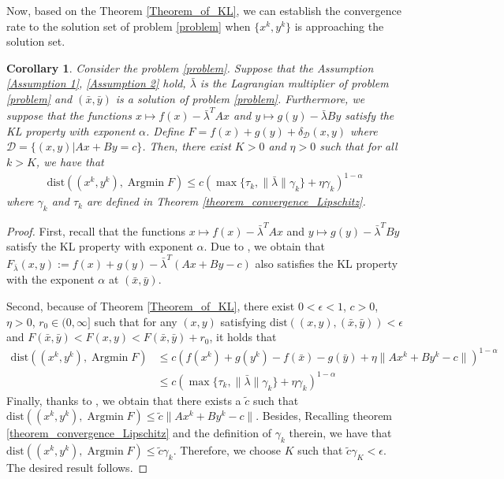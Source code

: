 \documentclass{article}
\numberwithin{equation}{section}
\newtheorem{corollary}{Corollary}[theorem]
\def\Argmin{\mathop{\mathrm{Argmin}}}
\begin{document}
    Now, based on the Theorem \ref{Theorem_of_KL}, we can establish the convergence rate to the solution set 
    of problem \ref{problem} when $\{x^k,y^k\}$ is approaching the solution set. 
    \begin{corollary}
        Consider the problem \ref{problem}. Suppose that the Assumption \ref{Assumption 1}, \ref{Assumption 2} 
        hold, $\bar{\lambda}$ is the Lagrangian multiplier of problem \ref{problem} and $(\bar{x}, \bar{y})$ is a 
        solution of problem \ref{problem}. Furthermore, we suppose that 
        the functions $x \mapsto f(x) -\bar{\lambda}^TAx$ and $y\mapsto g(y)-\bar{\lambda}By$ satisfy the KL property 
        with exponent $\alpha$. 
        Define $F = f(x)+ g(y)+ \delta_{\mathcal{D}}(x,y)$ where $\mathcal{D}=\{(x,y)|Ax+By=c\}$. 
        Then, there exist $K>0$ and $\eta>0$ such that for all $k>K$, we have that   
        \begin{align}
            \mathrm{dist}\left((x^k,y^k), \Argmin F\right) \leq  c(\max \{\tau_k, \|\bar{\lambda}\rVert\gamma_k\}+\eta\gamma_k)^{1-\alpha}   \nonumber
        \end{align}
        where $\gamma_k$ and $\tau_k$ are defined in Theorem \ref{theorem_convergence_Lipschitz}. 
    \end{corollary}
    \begin{proof}
        First, recall that the functions $x\mapsto f(x)-\bar{\lambda}^TAx$ and $y\mapsto g(y)-\bar{\lambda}^TBy$ 
        satisfy the KL property with exponent $\alpha$. Due to \cite[Theorem 3.3]{li2018calculus}, we obtain 
        that $F_{\bar{\lambda}}(x,y):= f(x)+g(y)-\bar{\lambda}^T(Ax+ By-c)$ also satisfies the 
        KL property with the exponent $\alpha$ at $(\bar{x}, \bar{y})$.  

        Second, because of Theorem \ref{Theorem_of_KL}, there exist $0<\epsilon<1$, $c>0$, $\eta>0$, $r_0 \in (0,\infty]$ such that 
        for any $(x,y)$ satisfying $\mathrm{dist}((x,y),(\bar{x},\bar{y}))<\epsilon$ and 
        $F(\bar{x},\bar{y})<F(x,y)<F(\bar{x},\bar{y})+ r_0$, it holds that 
        \begin{align}
            \mathrm{dist}\left((x^k,y^k), \Argmin F\right) &\leq  c\left(f(x^k) + g(y^k)-f(\bar{x})-g(\bar{y})+\eta\|Ax^k+By^k-c\rVert\right)^{1-\alpha} \nonumber \\
            & \leq c(\max \{\tau_k, \|\bar{\lambda}\rVert\gamma_k\}+\eta\gamma_k)^{1-\alpha} \nonumber
        \end{align}
        Finally, thanks to \cite[Lemma 3.2.3]{facchinei2003finite}, we obtain that there exists a $\tilde{c}$ 
        such that $\mathrm{dist}((x^k,y^k),\Argmin F )\leq \tilde{c}\|Ax^k+By^k -c\rVert$. Besides, 
        Recalling theorem \ref{theorem_convergence_Lipschitz} and the definition of $\gamma_k$ therein, we have that 
        $\mathrm{dist}((x^k,y^k),\Argmin F )\leq \tilde{c} \gamma_k$. Therefore, we choose $K$ such that 
        $\tilde{c}\gamma_K < \epsilon$. The desired result follows. 
    \end{proof}
\end{document}
